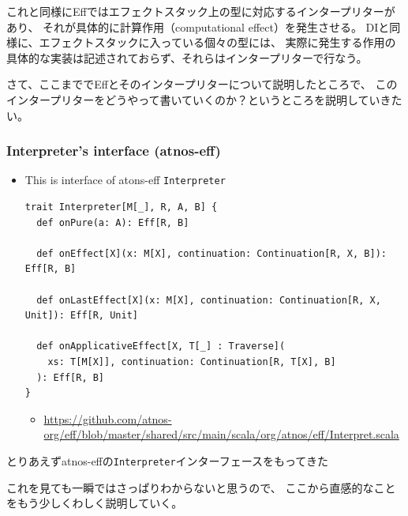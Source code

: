 \begin{frame}
\begin{notes}
    \item これと同様にEffではエフェクトスタック上の型に対応するインタープリターがあり、
    それが具体的に計算作用（computational effect）を発生させる。
    DIと同様に、エフェクトスタックに入っている個々の型には、
    実際に発生する作用の具体的な実装は記述されておらず、それらはインタープリターで行なう。

    \item さて、ここまででEffとそのインタープリターについて説明したところで、
    このインタープリターをどうやって書いていくのか？というところを説明していきたい。
  \end{notes}
\end{frame}

\begin{frame}[fragile]
  \label{fra:interface_interpreter}
  \frametitle{Interpreter's interface (atnos-eff)}

  \begin{itemize}
    \item This is interface of atons-eff \lstinline|Interpreter|
\begin{lstlisting}[style=scala]
trait Interpreter[M[_], R, A, B] {
  def onPure(a: A): Eff[R, B]

  def onEffect[X](x: M[X], continuation: Continuation[R, X, B]): Eff[R, B]

  def onLastEffect[X](x: M[X], continuation: Continuation[R, X, Unit]): Eff[R, Unit]

  def onApplicativeEffect[X, T[_] : Traverse](
    xs: T[M[X]], continuation: Continuation[R, T[X], B]
  ): Eff[R, B]
}
\end{lstlisting}
  
    \begin{itemize}
      \item \url{https://github.com/atnos-org/eff/blob/master/shared/src/main/scala/org/atnos/eff/Interpret.scala}
    \end{itemize}
  \end{itemize}

  \pause

  \begin{notes}
    \item とりあえずatnos-effの\lstinline|Interpreter|インターフェースをもってきた

    \item これを見ても一瞬ではさっぱりわからないと思うので、
    ここから直感的なことをもう少しくわしく説明していく。
  \end{notes}
\end{frame}

